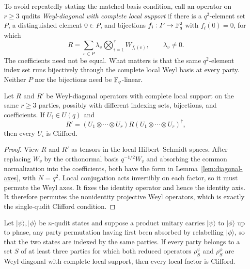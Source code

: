 \AMEFigureTwo

To avoid repeatedly stating the matched-basis condition, call an operator on
\(r\geq3\) qudits \emph{Weyl-diagonal with complete local support} if there
is a \(q^2\)-element set \(P\), a distinguished element \(0\in P\), and
bijections \(f_i:P\to\mathbb F_q^2\) with \(f_i(0)=0\), for which
\[
 R=\sum_{v\in P}\lambda_v
       \bigotimes_{i=1}^r W_{f_i(v)},\qquad \lambda_v\ne0.       \tag{3.2}
\]
The coefficients need not be equal.  What matters is that the same
\(q^2\)-element index set runs bijectively through the complete local
Weyl basis at every party.  Neither \(P\) nor the bijections need be
\(\mathbb F_q\)-linear.

\begin{proposition}
\label{prop:full-weyl-marginal}
Let \(R\) and \(R'\) be Weyl-diagonal operators with complete local support
on the same
\(r\geq3\) parties, possibly with different indexing sets, bijections,
and coefficients.  If \(U_i\in U(q)\) and
\[
 R'=(U_1\otimes\cdots\otimes U_r)R
       (U_1\otimes\cdots\otimes U_r)^\dagger ,
\]
then every \(U_i\) is Clifford.
\end{proposition}

\begin{proof}
View \(R\) and \(R'\) as tensors in the local Hilbert--Schmidt spaces.
After replacing \(W_v\) by the orthonormal basis \(q^{-1/2}W_v\) and
absorbing the common normalization into the coefficients, both have the
form in Lemma~\ref{lem:diagonal-axes}, with \(N=q^2\).
Local conjugation acts invertibly on each factor, so it must permute the
Weyl axes.  It fixes the identity operator and hence the identity axis.
It therefore permutes the nonidentity projective Weyl operators, which
is exactly the single-qudit Clifford condition.
\end{proof}

\begin{corollary}
\label{cor:full-weyl-cover}
Let \(\lvert\psi\rangle,\lvert\phi\rangle\) be \(n\)-qudit states and
suppose a product unitary carries \(\lvert\psi\rangle\) to
\(\lvert\phi\rangle\) up to phase, any party permutation having first been
absorbed by relabelling \(\lvert\phi\rangle\), so that the two states are
indexed by the same parties.  If every
party belongs to a set \(S\) of at least three parties for which both
reduced operators \(\rho^\psi_S\) and \(\rho^\phi_S\) are Weyl-diagonal
with complete local support, then every local factor is Clifford.
\end{corollary}

